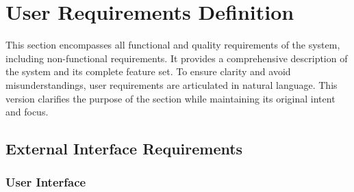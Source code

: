 \documentclass{scrreprt}
\begin{document}
\chapter{User Requirements Definition}
This section encompasses all functional and quality requirements of the system, including non-functional requirements. It provides a comprehensive description of the system and its complete feature set. To ensure clarity and avoid misunderstandings, user requirements are articulated in natural language.
This version clarifies the purpose of the section while maintaining its original intent and focus.

\section{External Interface Requirements}
\subsection{User Interface}
\end{document}
